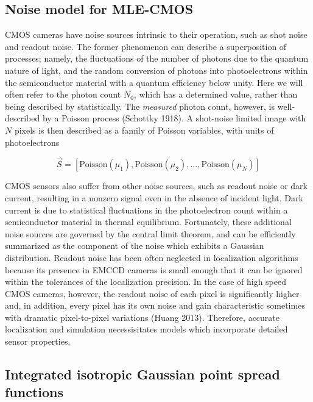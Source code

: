 \documentclass{ucetd}
\begin{document}
\subsection{Noise model for MLE-CMOS}


CMOS cameras have noise sources intrinsic to their operation, such as shot noise and readout noise. The former phenomenon can describe a superposition of processes; namely, the fluctuations of the number of photons due to the quantum nature of light, and the random conversion of photons into photoelectrons within the semiconductor material with a quantum efficiency below unity. Here we will often refer to the photon count $N_{0}$, which has a determined value, rather than being described by statistically. The \emph{measured} photon count, however, is well-described by a Poisson process (Schottky 1918). A shot-noise limited image with $N$ pixels is then described as a family of Poisson variables, with units of photoelectrons


\begin{equation}
\vec{S} = \left[\mathrm{Poisson}(\mu_{1}), \mathrm{Poisson}(\mu_{2}), ..., \mathrm{Poisson}(\mu_{N})\right]
\end{equation}

CMOS sensors also suffer from other noise sources, such as readout noise or dark current, resulting in a nonzero signal even in the absence of incident light. Dark current is due to statistical fluctuations in the photoelectron count within a semiconductor material in thermal equilibrium. Fortunately, these additional noise sources are governed by the central limit theorem, and can be efficiently summarized as the component of the noise which exhibits a Gaussian distribution. Readout noise has been often neglected in localization algorithms because its presence in EMCCD cameras is small enough that it can be ignored within the tolerances of the localization precision. In the case of high speed CMOS cameras, however, the readout noise of each pixel is significantly higher and, in addition, every pixel has its own noise and gain characteristic sometimes with dramatic pixel-to-pixel variations (Huang 2013). Therefore, accurate localization and simulation necessisitates models which incorporate detailed sensor properties. 


\subsection{Integrated isotropic Gaussian point spread functions}
\end{document}
